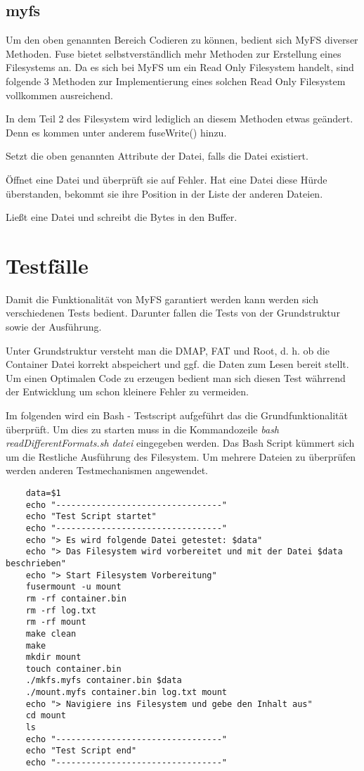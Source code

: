 \subsection{myfs}
Um den oben genannten Bereich Codieren zu können, bedient sich MyFS diverser Methoden. Fuse bietet selbstverständlich mehr Methoden zur Erstellung eines Filesystems an. Da es sich bei MyFS um ein Read Only Filesystem handelt, sind folgende 3 Methoden zur Implementierung eines solchen Read Only Filesystem vollkommen ausreichend. 

In dem Teil 2 des Filesystem wird lediglich an diesem Methoden etwas geändert. Denn es kommen unter anderem fuseWrite() hinzu.

\begin{description}[align=right,labelwidth=1.5cm]
	\item[\textbf{fuseGetAttr()}] Setzt die oben genannten Attribute der Datei, falls die Datei existiert.
	\item[\textbf{fuseOpen()}] Öffnet eine Datei und überprüft sie auf Fehler. Hat eine Datei diese Hürde überstanden, bekommt sie ihre Position in der Liste der anderen Dateien.
	\item[\textbf{fuseRead()}] Ließt eine Datei und schreibt die Bytes in den Buffer.

\end{description} 

\newpage

\section{Testfälle}
Damit die Funktionalität von MyFS garantiert werden kann werden sich verschiedenen Tests bedient. Darunter fallen die Tests von der Grundstruktur sowie der Ausführung. 

Unter Grundstruktur versteht man die DMAP, FAT und Root, d. h. ob die Container Datei korrekt abspeichert und ggf. die Daten zum Lesen bereit stellt. Um einen Optimalen Code zu erzeugen bedient man sich diesen Test währrend der Entwicklung um schon kleinere Fehler zu vermeiden.

Im folgenden wird ein Bash - Testscript aufgeführt das die Grundfunktionalität überprüft. Um dies zu starten muss in die Kommandozeile \textit{bash readDifferentFormats.sh datei} eingegeben werden. Das Bash Script kümmert sich um die Restliche Ausführung des Filesystem. Um mehrere Dateien zu überprüfen werden anderen Testmechanismen angewendet. 
\begin{lstlisting}
	data=$1
	echo "---------------------------------"
	echo "Test Script startet"
	echo "---------------------------------"
	echo "> Es wird folgende Datei getestet: $data"
	echo "> Das Filesystem wird vorbereitet und mit der Datei $data beschrieben"
	echo "> Start Filesystem Vorbereitung"
	fusermount -u mount
	rm -rf container.bin
	rm -rf log.txt
	rm -rf mount
	make clean
	make
	mkdir mount
	touch container.bin
	./mkfs.myfs container.bin $data
	./mount.myfs container.bin log.txt mount
	echo "> Navigiere ins Filesystem und gebe den Inhalt aus"
	cd mount 
	ls
	echo "---------------------------------"
	echo "Test Script end"
	echo "---------------------------------"
\end{lstlisting}

